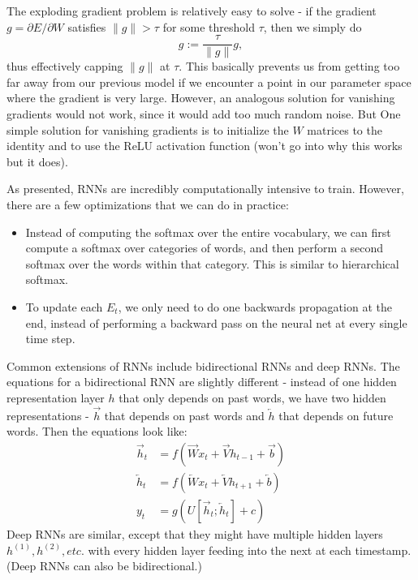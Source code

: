 The exploding gradient problem is relatively easy to solve - if the gradient $g = \partial E/\partial W$ satisfies $\| g \| > \tau$ for some threshold $\tau$, then we simply do
$$g := \frac{\tau}{\| g\|}g,$$
thus effectively capping $\|g\|$ at $\tau$. This basically prevents us from getting too far away from our previous model if we encounter a point in our parameter space where the gradient is very large. However, an analogous solution for vanishing gradients would not work, since it would add too much random noise. But One simple solution for vanishing gradients is to initialize the $W$ matrices to the identity and to use the ReLU activation function (won't go into why this works but it does).

As presented, RNNs are incredibly computationally intensive to train. However, there are a few optimizations that we can do in practice:
\begin{itemize}
\item Instead of computing the softmax over the entire vocabulary, we can first compute a softmax over categories of words, and then perform a second softmax over the words within that category. This is similar to hierarchical softmax.
\item To update each $E_t$, we only need to do one backwards propagation at the end, instead of performing a backward pass on the neural net at every single time step.
\end{itemize}

Common extensions of RNNs include bidirectional RNNs and deep RNNs. The equations for a bidirectional RNN are slightly different - instead of one hidden representation layer $h$ that only depends on past words, we have two hidden representations - $\overrightarrow{h}$ that depends on past words and $\overleftarrow{h}$ that depends on future words. Then the equations look like:
\begin{align*}
\overrightarrow{h}_t &= f(\overrightarrow{W}x_t + \overrightarrow{V}h_{t-1} + \overrightarrow{b}) \\
\overleftarrow{h}_t &= f(\overleftarrow{W}x_t + \overleftarrow{V}h_{t+1} + \overleftarrow{b}) \\
y_t &= g(U[\overrightarrow{h}_t; \overleftarrow{h}_t] + c)
\end{align*}
Deep RNNs are similar, except that they might have multiple hidden layers $h^{(1)}, h^{(2)}, etc.$ with every hidden layer feeding into the next at each timestamp. (Deep RNNs can also be bidirectional.)
